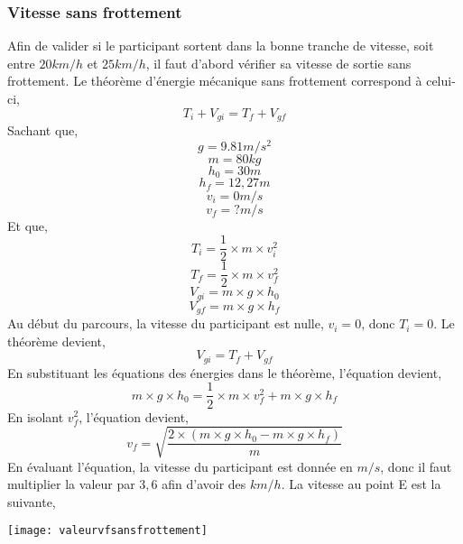 \documentclass[12pt]{article}
\begin{document}
\subsubsection{Vitesse sans frottement}
Afin de valider si le participant sortent dans la bonne tranche de vitesse, soit entre $20km/h$ et $25km/h$, il faut d'abord vérifier sa vitesse de sortie sans frottement. Le théorème d'énergie mécanique sans frottement correspond à celui-ci, 
\begin{equation}
T_i + V_{gi} = T_f + V_{gf}
\end{equation}
Sachant que,
\begin{equation}
g = 9.81m/s^2
\end{equation}
\begin{equation}
m = 80kg
\end{equation}
\begin{equation}
h_0 = 30m
\end{equation}
\begin{equation}
h_f = 12,27m
\end{equation}
\begin{equation}
v_i = 0m/s
\end{equation}
\begin{equation}
v_f = ?m/s
\end{equation}
Et que,
\begin{equation}
T_i = \frac{1}{2} \times m \times v_i^2
\end{equation}
\begin{equation}
T_f = \frac{1}{2} \times m \times v_f^2
\end{equation}
\begin{equation}
V_{gi} = m \times g \times h_0
\end{equation}
\begin{equation}
V_{gf} = m \times g \times h_f
\end{equation}
Au début du parcours, la vitesse du participant est nulle, $v_i = 0$, donc $T_i = 0$. Le théorème devient,
\begin{equation}
V_{gi} = T_f + V_{gf}
\end{equation}
En substituant les équations des énergies dans le théorème, l'équation devient,
\begin{equation}
m \times g \times h_0 = \frac{1}{2} \times m \times v_f^2 + m \times g \times h_f
\end{equation}
En isolant $v_f^2$, l'équation devient,
\begin{equation}
v_f = \sqrt{\frac{2 \times (m \times g \times h_0 - m \times g \times h_f)}{m}}
\end{equation}
En évaluant l'équation, la vitesse du participant est donnée en $m/s$, donc il faut multiplier la valeur par $3,6$ afin d'avoir des $km/h$. La vitesse au point E est la suivante,
\begin{center}
	\texttt{[image: valeurvfsansfrottement]}
\end{center}
\end{document}
